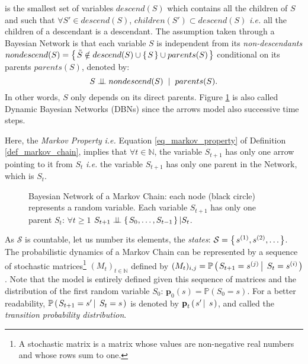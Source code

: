 is the smallest set of variables $descend(S)$
which contains all the children of $S$ 
and such that $\forall S' \in descend(S)$, $children(S') \subset descend(S)$ 
\textit{i.e.} all the children of a descendant is a descendant.
The assumption taken through a Bayesian Network is that each variable $S$ 
is independent from its \textit{non-descendants} 
$nondescend(S) = \left\{ \left. \tilde{S} \notin descend(S) \cup \left\{ \left.  S  \right. \right\} \cup parents(S)  \right. \right\}$
conditional on its parents $parents(S)$,
denoted by: 
\[ S \perp\!\!\!\perp nondescend(S) \hspace{0.2cm} \vert \hspace{0.2cm} parents(S). \]
In other words, $S$ only depends on its direct parents. 
Figure \ref{fig_markov_chain} is also called Dynamic Bayesian Networks (DBNs) 
\cite{Dean:1989:DBN} since the arrows model also successive time steps. 


Here, the \textit{Markov Property} \textit{i.e.} 
Equation \ref{eq_markov_property} of Definition \ref{def_markov_chain},
implies that $\forall t \in \mathbb{N}$,
the variable $S_{t+1}$
has only one arrow pointing to it
from $S_t$
\textit{i.e.} 
the variable $S_{t+1}$ has only one parent
in the Network, which is $S_{t}$.
\begin{figure}

\caption[Bayesian Network of a Markov Chain]{Bayesian Network of a Markov Chain:
each node (black circle) represents a random variable. 
Each variable $S_{t+1}$ has only one parent $S_t$: $\forall t\geqslant1$
$S_{t+1} \perp\!\!\!\perp \left\{ \left.  S_{0}, \ldots, S_{t-1}  \right. \right\} \vert S_t$.}
\label{fig_markov_chain}
\end{figure}

As $\mathcal{S}$ is countable, 
let us number its elements, the \textit{states}: 
$\mathcal{S}=\left\{ \left.  s^{(1)},s^{(2)}, \ldots \right. \right\}$. 
The probabilistic dynamics of a Markov Chain 
can be represented by 
a sequence of stochastic matrices\footnote{A stochastic matrix
is a matrix whose values are non-negative real numbers and whose rows sum to one.} 
$(M_{t})_{t \in \mathbb{N}}$ 
defined by $ (M_t)_{i,j} = \mathbb{P} \left( \left.  S_{t+1}=s^{(j)} \, \right| \left. \, S_{t} = s^{(i)} \right. \right)$.
Note that the model is entirely defined 
given this sequence of matrices 
and the distribution of the first random variable $S_0$:
$\textbf{p}_0(s) = \mathbb{P}(S_0=s)$.
For a better readability, $\mathbb{P} \left( \left.  S_{t+1}=s' \, \right| \left. \, S_{t} = s \right. \right)$ 
is denoted by $\textbf{p}_t \left( \left. s' \, \right| \left. \, s \right. \right)$,
and called the 	\textit{transition probability distribution}.

